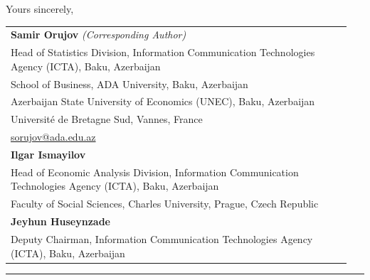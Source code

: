 \documentclass[12pt]{article}
\begin{document}
\vspace{16pt}
\noindent Yours sincerely,

\vspace{12pt}
\begin{tabular}{@{}p{0.95\linewidth}}
  \textbf{Samir Orujov} \textit{(Corresponding Author)}\\[2pt]
  Head of Statistics Division,
  Information Communication Technologies Agency (ICTA), Baku, Azerbaijan\\
  School of Business, ADA University, Baku, Azerbaijan\\
  Azerbaijan State University of Economics (UNEC), Baku, Azerbaijan\\
  Universit\'{e} de Bretagne Sud, Vannes, France\\
  \href{mailto:sorujov@ada.edu.az}{sorujov@ada.edu.az}\\[8pt]

  \textbf{Ilgar Ismayilov}\\[2pt]
  Head of Economic Analysis Division,
  Information Communication Technologies Agency (ICTA), Baku, Azerbaijan\\
  Faculty of Social Sciences, Charles University, Prague, Czech Republic\\[8pt]

  \textbf{Jeyhun Huseynzade}\\[2pt]
  Deputy Chairman,
  Information Communication Technologies Agency (ICTA), Baku, Azerbaijan\\
\end{tabular}

\vspace{6pt}
{\color{accentblue}\rule{\linewidth}{0.8pt}}
\end{document}
